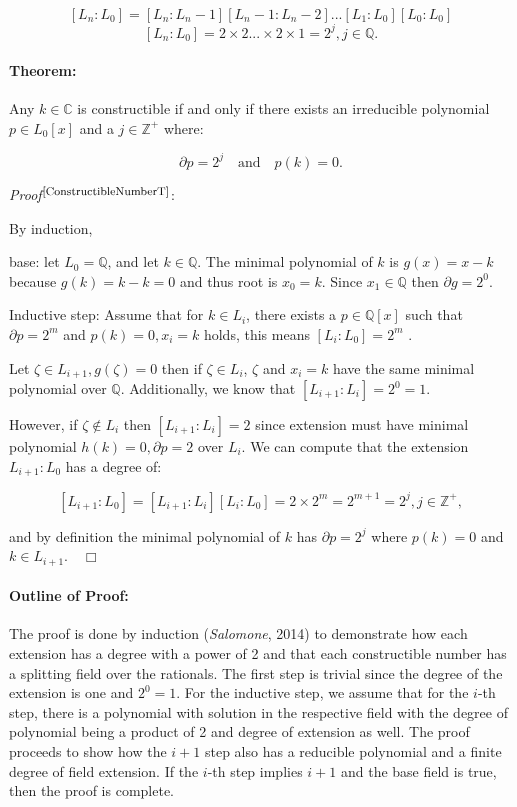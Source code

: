 \documentclass{article}
\begin{document}
$$[L_n : L_0] = [L_n : L_n-1] [L_n-1 : L_n-2] ...[L_1 : L_0] [L_0 : L_0] $$
$$[L_n : L_0] = 2\times 2...\times2\times 1 = 2^j,j\in\mathbb{Q}.$$

\paragraph{Theorem:} Any $k\in\mathbb{C}$ is constructible if and only if there exists an irreducible polynomial $p\in L_0[x]$ and a $j\in\mathbb{Z}^{+}$ where:

$$\partial p = 2^j \quad \textrm{and} \quad p(k) = 0.$$

\textit{Proof}$^{\textrm{\footnotesize\cite{ConstructibleNumberT}}}$:
\par By induction, 
\par
 base: let $L_0 = \mathbb{Q}$, and let $k\in\mathbb{Q}$. The minimal polynomial of $k$ is $g(x) = x-k$ because $g(k) = k-k = 0$ and thus root is $x_0 = k$. Since $x_1\in\mathbb{Q}$ then $\partial g = 2^0$.
\par
Inductive step: Assume that for $k\in L_i$, there exists a $p\in\mathbb{Q}[x]$ such that $\partial p = 2^m$ and $p(k) = 0, x_i = k$ holds, this means $[L_{i}: L_0] = 2^m$ .
\par
Let $\zeta\in L_{i+1},g(\zeta) = 0$ then if $\zeta\in L_i$, $\zeta$ and $x_i = k$ have the same minimal polynomial over $\mathbb{Q}$. Additionally, we know that $[L_{i+1}: L_i] = 2^0 = 1$.
\par 
However, if $\zeta\notin L_i$ then $[L_{i+1}: L_i] = 2$ since extension must have minimal polynomial $h(k) = 0, \partial p = 2$ over $L_i$. We can compute that the extension $L_{i+1} : L_0$ has a degree of:

$$ [L_{i+1}: L_0] =[L_{i+1}: L_i][L_{i}: L_0] = 2 \times 2^m = 2^{m+1} = 2^j,j\in\mathbb{Z}^{+},$$

and by definition the minimal polynomial of $k$ has $\partial p = 2^j$ where $p(k) = 0$ and $k\in L_{i+1}. \quad \Box$

\paragraph{Outline of Proof:}
The proof is done by induction (\textit{Salomone}, 2014) to demonstrate how each extension has a degree with a power of 2 and that each constructible number has a splitting field over the rationals. The first step is trivial since the degree of the extension is one and $2^0 = 1$. For the inductive step, we assume that for the $i$-th step, there is a polynomial with solution in the respective field with the degree of polynomial being a product of 2 and degree of extension as well. The proof proceeds to show how the $ i+1$ step also has a reducible polynomial and a finite degree of field extension. If the $i$-th step implies $i+1$ and the base field is true, then the proof is complete. 
\end{document}
